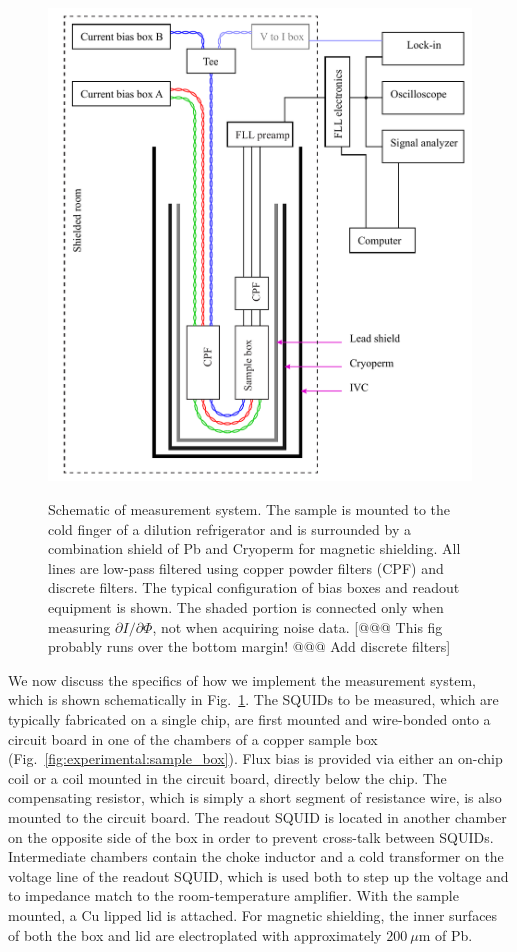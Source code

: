 \begin{figure}
\centering\includegraphics{experimental/Fig_meas_schematic}\\
\caption[Schematic of measurement system]{Schematic of measurement system. The sample is mounted to the cold finger of a dilution refrigerator and is surrounded by a combination shield of Pb and Cryoperm for magnetic shielding. All lines are low-pass filtered using copper powder filters (CPF) and discrete filters. The typical configuration of bias boxes and readout equipment is shown. The shaded portion is connected only when measuring $\partial I/\partial \Phi$, not when acquiring noise data. [@@@ This fig probably runs over the bottom margin! @@@ Add discrete filters]}
\label{fig:experimental:meas_schem}
\end{figure}

We now discuss the specifics of how we implement the measurement system, which is shown schematically in Fig.~\ref{fig:experimental:meas_schem}. The SQUIDs to be measured, which are typically fabricated on a single chip, are first mounted and wire-bonded onto a circuit board in one of the chambers of a copper sample box (Fig.~\ref{fig:experimental:sample_box}). Flux bias is provided via either an on-chip coil or a coil mounted in the circuit board, directly below the chip. The compensating resistor, which is simply a short segment of resistance wire, is also mounted to the circuit board. The readout SQUID is located in another chamber on the opposite side of the box in order to prevent cross-talk between SQUIDs. Intermediate chambers contain the choke inductor and a cold transformer on the voltage line of the readout SQUID, which is used both to step up the voltage and to impedance match to the room-temperature amplifier. With the sample mounted, a Cu lipped lid is attached. For magnetic shielding, the inner surfaces of both the box and lid are electroplated with approximately $200~\mu$m of Pb.


